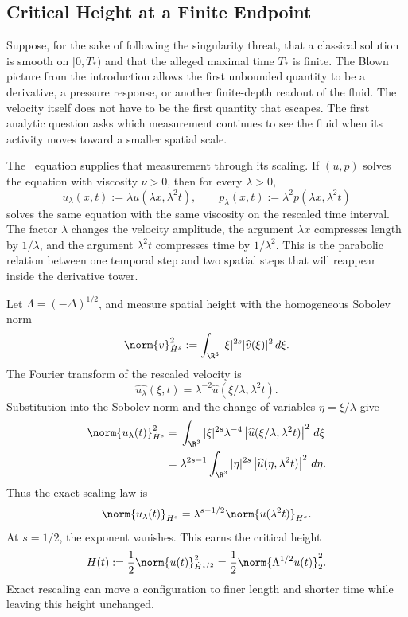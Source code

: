 
\subsection{Critical Height at a Finite Endpoint}\label{sub:CriticalHeightAtAFiniteEndpoint}

Suppose, for the sake of following the singularity threat, that a classical solution is smooth on \([0,T_*)\) and that the alleged maximal time \(T_*\) is finite.
The Blown picture from the introduction allows the first unbounded quantity to be a derivative, a pressure response, or another finite-depth readout of the fluid.
The velocity itself does not have to be the first quantity that escapes.
The first analytic question asks which measurement continues to see the fluid when its activity moves toward a smaller spatial scale.

The \NavierStokes\ equation supplies that measurement through its scaling.
If \((u,p)\) solves the equation with viscosity \(\nu>0\), then for every \(\lambda>0\),
\[
  u_\lambda(x,t)
  :=\lambda u(\lambda x,\lambda^2t),
  \qquad
  p_\lambda(x,t)
  :=\lambda^2p(\lambda x,\lambda^2t)
\]
solves the same equation with the same viscosity on the rescaled time interval.
The factor \(\lambda\) changes the velocity amplitude, the argument \(\lambda x\) compresses length by \(1/\lambda\), and the argument \(\lambda^2t\) compresses time by \(1/\lambda^2\).
This is the parabolic relation between one temporal step and two spatial steps that will reappear inside the derivative tower.

Let \(\Lambda=(-\Delta)^{1/2}\), and measure spatial height with the homogeneous Sobolev norm
\[
  \norm{v}_{\dot H^s}^2
  :=
  \int_{\R^3}|\xi|^{2s}|\widehat v(\xi)|^2\,d\xi.
\]
The Fourier transform of the rescaled velocity is
\[
  \widehat{u_\lambda}(\xi,t)
  =
  \lambda^{-2}\widehat u(\xi/\lambda,\lambda^2t).
\]
Substitution into the Sobolev norm and the change of variables \(\eta=\xi/\lambda\) give
\begin{align*}
  \norm{u_\lambda(t)}_{\dot H^s}^{2}
  &={}
  \int_{\R^3}
  |\xi|^{2s}\lambda^{-4}
  \left|\widehat u(\xi/\lambda,\lambda^2t)\right|^2
  \,d\xi
  \\
  &={}
  \lambda^{2s-1}
  \int_{\R^3}
  |\eta|^{2s}
  \left|\widehat u(\eta,\lambda^2t)\right|^2
  \,d\eta.
\end{align*}
Thus the exact scaling law is
\[
  \norm{u_\lambda(t)}_{\dot H^s}
  =
  \lambda^{s-1/2}
  \norm{u(\lambda^2t)}_{\dot H^s}.
\]
At \(s=1/2\), the exponent vanishes.
This earns the critical height
\[
  H(t)
  :=
  \frac12\norm{u(t)}_{\dot H^{1/2}}^2
  =
  \frac12\norm{\Lambda^{1/2}u(t)}_2^2.
\]
Exact rescaling can move a configuration to finer length and shorter time while leaving this height unchanged.

